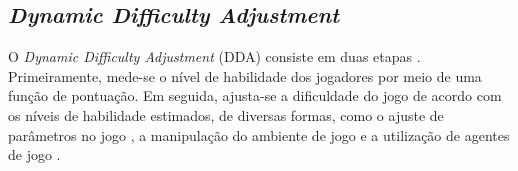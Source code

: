 \subsection{\textit{Dynamic Difficulty Adjustment}}
    O \textit{Dynamic Difficulty Adjustment} (DDA) 
    consiste em duas etapas \cite{zohaib2018dynamic}.
    Primeiramente, mede-se o nível de habilidade dos 
    jogadores por meio de uma função de pontuação. 
    Em seguida, ajusta-se a dificuldade do jogo de 
    acordo com os níveis de habilidade estimados, de 
    diversas formas, como o ajuste de parâmetros no jogo
    \cite{denisova2015adaptation},
    a manipulação do ambiente de jogo
    \cite{duque2020finding,lora2016dynamic} 
    e a utilização de agentes de jogo
    \cite{demediuk2017monte,ishihara2018monte}.